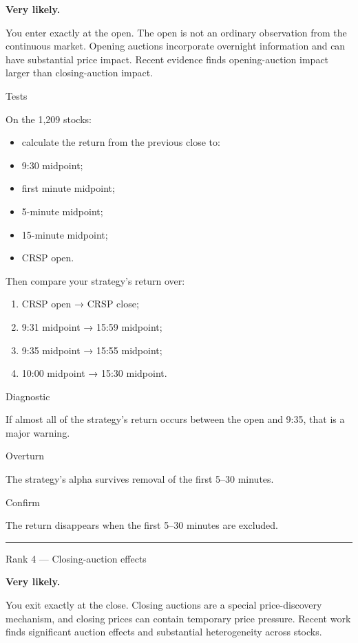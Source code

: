 \textbf{Very likely.}

You enter exactly at the open. The open is not an ordinary observation from the continuous market. Opening auctions incorporate overnight information and can have substantial price impact. Recent evidence finds opening-auction impact larger than closing-auction impact.

Tests

On the 1,209 stocks:

\begin{itemize}
\tightlist
\item
  calculate the return from the previous close to:
\item
  9:30 midpoint;
\item
  first minute midpoint;
\item
  5-minute midpoint;
\item
  15-minute midpoint;
\item
  CRSP open.
\end{itemize}

Then compare your strategy's return over:

\begin{enumerate}
\def\labelenumi{\arabic{enumi}.}
\tightlist
\item
  CRSP open → CRSP close;
\item
  9:31 midpoint → 15:59 midpoint;
\item
  9:35 midpoint → 15:55 midpoint;
\item
  10:00 midpoint → 15:30 midpoint.
\end{enumerate}

Diagnostic

If almost all of the strategy's return occurs between the open and 9:35, that is a major warning.

Overturn

The strategy's alpha survives removal of the first 5--30 minutes.

Confirm

The return disappears when the first 5--30 minutes are excluded.

\begin{center}\rule{0.5\linewidth}{0.5pt}\end{center}

Rank 4 --- Closing-auction effects

\textbf{Very likely.}

You exit exactly at the close. Closing auctions are a special price-discovery mechanism, and closing prices can contain temporary price pressure. Recent work finds significant auction effects and substantial heterogeneity across stocks.

